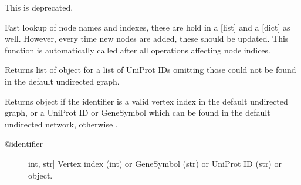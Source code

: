 \documentclass[letterpaper,10pt,english]{sphinxmanual}
\begin{document}
\begin{fulllineitems}
\begin{fulllineitems}
\end{fulllineitems}


\begin{fulllineitems}
\label{\detokenize{main:pypath.main.PyPath.update_vindex}}
This is deprecated.

\end{fulllineitems}


\begin{fulllineitems}
\label{\detokenize{main:pypath.main.PyPath.update_vname}}
Fast lookup of node names and indexes, these are hold in a
{[}list{]} and a {[}dict{]} as well. However, every time new nodes are
added, these should be updated. This function is automatically
called after all operations affecting node indices.

\end{fulllineitems}


\begin{fulllineitems}
\label{\detokenize{main:pypath.main.PyPath.ups}}
Returns list of  object
for a list of UniProt IDs omitting those
could not be found in the default
undirected graph.

\end{fulllineitems}


\begin{fulllineitems}
\label{\detokenize{main:pypath.main.PyPath.v}}
Returns  object if the identifier
is a valid vertex index in the default undirected graph,
or a UniProt ID or GeneSymbol which can be found in the
default undirected network, otherwise .
\begin{description}
\item[{@identifier}] \leavevmode{[}int, str{]}
Vertex index (int) or GeneSymbol (str) or UniProt ID (str) or
 object.


\end{description}
\end{fulllineitems}
\end{fulllineitems}
\end{document}
